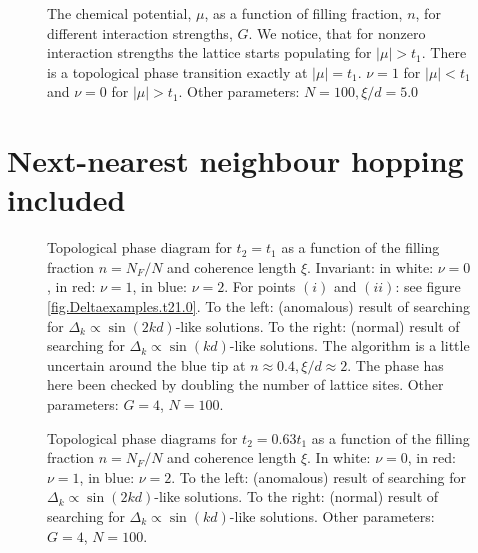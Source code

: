 \begin{figure}
\begin{center}

\caption{The chemical potential, $\mu$, as a function of filling fraction, $n$, for different interaction strengths, $G$. We notice, that for nonzero interaction strengths the lattice starts populating for $|\mu| > t_1$. There is a topological phase transition exactly at $|\mu| = t_1$. $\nu = 1$ for $|\mu|< t_1$ and $\nu = 0$ for $|\mu| > t_1$. Other parameters: $N = 100, \xi / d = 5.0$}
\label{fig.mun.t20.Gdepend}
\end{center}
\end{figure}

\section{Next-nearest neighbour hopping included}
\label{sec.NNNincluded} 

\begin{figure}
\begin{center}

\caption{Topological phase diagram for $t_2 = t_1$ as a function of the filling fraction $n = N_F/N$ and coherence length $\xi$. Invariant: in white: $\nu = 0$, in red: $\nu = 1$, in blue: $\nu = 2$. For points $(i)$ and $(ii)$: see figure \ref{fig.Deltaexamples.t21.0}. To the left: (anomalous) result of searching for $\Delta_k\propto \sin(2kd)$-like solutions. To the right: (normal) result of searching for $\Delta_k \propto \sin(kd)$-like solutions. The algorithm is a little uncertain around the blue tip at $n \approx 0.4, \xi / d \approx 2$. The phase has here been checked by doubling the number of lattice sites. Other parameters: $G = 4$, $N = 100$. }
\label{fig.phasediagram.t21.0}
\vspace{0.5cm}

\caption{Topological phase diagrams for $t_2 = 0.63t_1$ as a function of the filling fraction $n = N_F/N$ and coherence length $\xi$. In white: $\nu = 0$, in red: $\nu = 1$, in blue: $\nu = 2$. To the left: (anomalous) result of searching for $\Delta_k\propto \sin(2kd)$-like solutions. To the right: (normal) result of searching for $\Delta_k \propto \sin(kd)$-like solutions. Other parameters: $G = 4$, $N = 100$. }
\label{fig.phasediagram.t20.63}
\end{center}
\end{figure}

